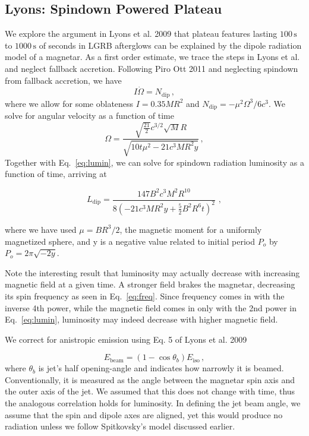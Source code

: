 \documentclass{article}
\begin{document}
\subsection{Lyons: Spindown Powered Plateau}
We explore the argument in Lyons et al. 2009 \cite{Lyons:2009ka} that plateau features lasting $100\,\mathrm{s}$ to $1000\,\mathrm{s}$ of seconds in LGRB afterglows can be explained by the dipole radiation model of a magnetar.
As a first order estimate, we trace the steps in Lyons et al. and neglect fallback accretion. Following Piro Ott 2011 \cite{Piro:2011ed} and neglecting spindown from fallback accretion, we have
\begin{equation} I \dot{\Omega}=N_{\mathrm{dip}}\,, \end{equation}
where we allow for some oblateness  $I= 0.35 M R^2$\cite{Lattimer:2001ap} and $N_{\mathrm{dip}}= -\mu ^2 \Omega^3/6c^3$.
We solve for angular velocity as a function of time
\begin{equation}\label{eq:freq}
\Omega = \frac{\sqrt{\frac{21}{2}} c^{3/2} \sqrt{M} R}{\sqrt{10 t\mu^2 - 21 c^3 M R^2 y}}\,,
\end{equation}
Together with Eq.~\ref{eq:lumin}, we can solve for spindown radiation luminosity as a function of time, arriving at

\begin{equation}
L_{\mathrm{dip}}=\frac{147 B^2 c^3 M^2 R^{10}}{8(-21 c^3 M R^2 y+ \frac{5}{2} B^2 R^6 t)^2}\,\,,
\end{equation}

where we have used $\mu= B R^3/2$, the magnetic moment for a uniformly magnetized sphere, and y is a negative value related to initial period $P_o$ by $P_o= 2\pi \sqrt{-2 y}$.

\hspace{4cm}

Note the interesting result that luminosity may actually decrease with increasing magnetic field at a given time. A stronger field brakes the magnetar, decreasing its spin frequency as seen in Eq.~\ref{eq:freq}. Since frequency comes in with the inverse 4th power, while the magnetic field comes in only with the 2nd power in Eq.~\ref{eq:lumin}, luminosity may indeed decrease with higher magnetic field.

We correct for anistropic emission using Eq. 5 of Lyons et al. 2009 \cite{Lyons:2009ka}

\begin{equation}
 E_{\mathrm{beam}}= (1-\cos{\theta_b}) E_{\mathrm{iso}}\,,
 \end{equation}
 where $\theta_b$ is jet's half opening-angle and indicates how narrowly it is beamed. Conventionally, it is measured as the angle between the magnetar spin axis and the outer axis of the jet. We assumed that this does not change with time, thus the analogous correlation holds for luminosity. In defining the jet beam angle, we assume that the spin and dipole axes are aligned, yet this would produce no radiation unless we follow Spitkovsky's model discussed earlier. 
\end{document}
